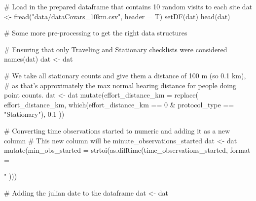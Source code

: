 \documentclass[]{article}
\newenvironment{Shaded}{}{}
\newcommand{\CommentTok}[1]{\textcolor[rgb]{0.00,0.50,0.00}{#1}}
\newcommand{\DataTypeTok}[1]{#1}
\newcommand{\DecValTok}[1]{#1}
\newcommand{\FloatTok}[1]{#1}
\newcommand{\KeywordTok}[1]{\textcolor[rgb]{0.00,0.00,1.00}{#1}}
\newcommand{\NormalTok}[1]{#1}
\newcommand{\OperatorTok}[1]{#1}
\newcommand{\StringTok}[1]{\textcolor[rgb]{0.00,0.50,0.50}{#1}}
\begin{document}
\begin{Shaded}
\begin{Highlighting}[]
\CommentTok{# Load in the prepared dataframe that contains 10 random visits to each site}
\NormalTok{dat <-}\StringTok{ }\KeywordTok{fread}\NormalTok{(}\StringTok{"data/dataCovars_10km.csv"}\NormalTok{, }\DataTypeTok{header =}\NormalTok{ T)}
\KeywordTok{setDF}\NormalTok{(dat)}
\KeywordTok{head}\NormalTok{(dat)}

\CommentTok{# Some more pre-processing to get the right data structures}

\CommentTok{# Ensuring that only Traveling and Stationary checklists were considered}
\KeywordTok{names}\NormalTok{(dat)}
\NormalTok{dat <-}\StringTok{ }\NormalTok{dat }\OperatorTok{%

\CommentTok{# We take all stationary counts and give them a distance of 100 m (so 0.1 km),}
\CommentTok{# as that's approximately the max normal hearing distance for people doing point counts.}
\NormalTok{dat <-}\StringTok{ }\NormalTok{dat }\OperatorTok{%
\StringTok{  }\KeywordTok{mutate}\NormalTok{(}\DataTypeTok{effort_distance_km =} \KeywordTok{replace}\NormalTok{(}
\NormalTok{    effort_distance_km,}
    \KeywordTok{which}\NormalTok{(effort_distance_km }\OperatorTok{==}\StringTok{ }\DecValTok{0} \OperatorTok{&}
\StringTok{      }\NormalTok{protocol_type }\OperatorTok{==}\StringTok{ "Stationary"}\NormalTok{),}
    \FloatTok{0.1}
\NormalTok{  ))}

\CommentTok{# Converting time observations started to numeric and adding it as a new column}
\CommentTok{# This new column will be minute_observations_started}
\NormalTok{dat <-}\StringTok{ }\NormalTok{dat }\OperatorTok{%
\StringTok{  }\KeywordTok{mutate}\NormalTok{(}\DataTypeTok{min_obs_started =} \KeywordTok{strtoi}\NormalTok{(}\KeywordTok{as.difftime}\NormalTok{(time_observations_started,}
    \DataTypeTok{format =} \StringTok{"%
\NormalTok{  )))}

\CommentTok{# Adding the julian date to the dataframe}
\NormalTok{dat <-}\StringTok{ }\NormalTok{dat }\OperatorTok{%

}}}}}
\end{Highlighting}
\end{Shaded}
\end{document}
